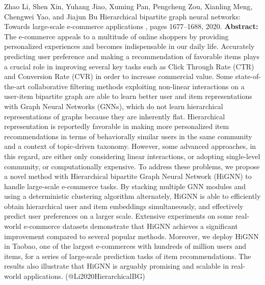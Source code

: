 \documentclass{article}
\begin{document}
\begin{thebibliography}{}
 Zhao Li, Shen Xin, Yuhang Jiao, Xuming Pan, Pengcheng Zou, Xianling Meng, Chengwei Yao, and Jiajun Bu \newblock Hierarchical bipartite graph neural networks: Towards large-scale e-commerce applications , pages 1677--1688, 2020. \newblock \textbf{Abstract:} The e-commerce appeals to a multitude of online shoppers by providing personalized experiences and becomes indispensable in our daily life. Accurately predicting user preference and making a recommendation of favorable items plays a crucial role in improving several key tasks such as Click Through Rate (CTR) and Conversion Rate (CVR) in order to increase commercial value. Some state-of-the-art collaborative filtering methods exploiting non-linear interactions on a user-item bipartite graph are able to learn better user and item representations with Graph Neural Networks (GNNs), which do not learn hierarchical representations of graphs because they are inherently flat. Hierarchical representation is reportedly favorable in making more personalized item recommendations in terms of behaviorally similar users in the same community and a context of topic-driven taxonomy. However, some advanced approaches, in this regard, are either only considering linear interactions, or adopting single-level community, or computationally expensive. To address these problems, we propose a novel method with Hierarchical bipartite Graph Neural Network (HiGNN) to handle large-scale e-commerce tasks. By stacking multiple GNN modules and using a deterministic clustering algorithm alternately, HiGNN is able to efficiently obtain hierarchical user and item embeddings simultaneously, and effectively predict user preferences on a larger scale. Extensive experiments on some real-world e-commerce datasets demonstrate that HiGNN achieves a significant improvement compared to several popular methods. Moreover, we deploy HiGNN in Taobao, one of the largest e-commerces with hundreds of million users and items, for a series of large-scale prediction tasks of item recommendations. The results also illustrate that HiGNN is arguably promising and scalable in real-world applications. \newblock (@Li2020HierarchicalBG)


\end{thebibliography}
\end{document}
